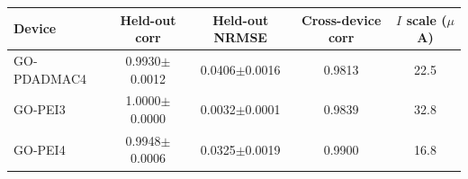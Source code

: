 \begin{tabular}{lcccc}
\toprule
Device & Held-out corr & Held-out NRMSE & Cross-device corr & $I$ scale ($\mu$A) \\
\midrule
GO-PDADMAC4 & 0.9930$\pm$0.0012 & 0.0406$\pm$0.0016 & 0.9813 & 22.5 \\
GO-PEI3 & 1.0000$\pm$0.0000 & 0.0032$\pm$0.0001 & 0.9839 & 32.8 \\
GO-PEI4 & 0.9948$\pm$0.0006 & 0.0325$\pm$0.0019 & 0.9900 & 16.8 \\
\bottomrule
\end{tabular}

